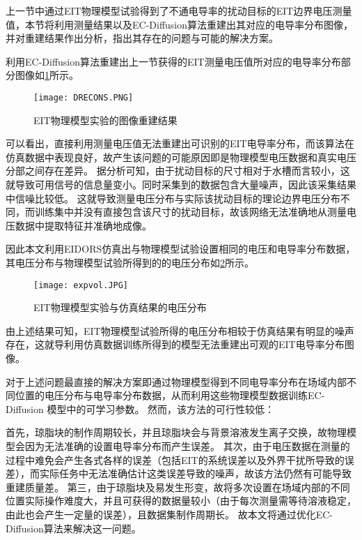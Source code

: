 上一节中通过EIT物理模型试验得到了不通电导率的扰动目标的EIT边界电压测量值，本节将利用测量结果以及EC-Diffusion算法重建出其对应的电导率分布图像，
并对重建结果作出分析，指出其存在的问题与可能的解决方案。

利用EC-Diffusion算法重建出上一节获得的EIT测量电压值所对应的电导率分布部分图像如\cref{figure:DRECONS}所示。
\begin{figure}[h]
    \centering
    \texttt{[image: DRECONS.PNG]}
    \caption{EIT物理模型实验的图像重建结果}
    \label{figure:DRECONS}
\end{figure}

可以看出，直接利用测量电压值无法重建出可识别的EIT电导率分布，而该算法在仿真数据中表现良好，故产生该问题的可能原因即是物理模型电压数据和真实电压分部之间存在差异。
据分析可知，由于扰动目标的尺寸相对于水槽而言较小，这就导致可用信号的信息量变小。同时采集到的数据包含大量噪声，因此该采集结果中信噪比较低。
这就导致测量电压分布与实际该扰动目标的理论边界电压分布不同，而训练集中并没有直接包含该尺寸的扰动目标，故该网络无法准确地从测量电压数据中提取特征并准确地成像。

因此本文利用EIDORS仿真出与物理模型试验设置相同的电压和电导率分布数据，其电压分布与物理模型试验所得到的的电压分布如\cref{figure:expvol}所示。
\begin{figure}[h]
    \centering
    \texttt{[image: expvol.JPG]}
    \caption{EIT物理模型实验与仿真结果的电压分布}
    \label{figure:expvol}
\end{figure}

由上述结果可知，EIT物理模型试验所得的电压分布相较于仿真结果有明显的噪声存在，这就导利用仿真数据训练所得到的模型无法重建出可观的EIT电导率分布图像。

对于上述问题最直接的解决方案即通过物理模型得到不同电导率分布在场域内部不同位置的电压分布与电导率分布数据，从而利用这些物理模型数据训练EC-Diffusion 模型中的可学习参数。
然而，该方法的可行性较低：

首先，琼脂块的制作周期较长，并且琼脂块会与背景溶液发生离子交换，故物理模型会因为无法准确的设置电导率分布而产生误差。
其次，由于电压数据在测量的过程中难免会产生各式各样的误差（包括EIT的系统误差以及外界干扰所导致的误差），而实际任务中无法准确估计这类误差导致的噪声，故该方法仍然有可能导致重建质量差。
第三，由于琼脂块及易发生形变，故将多次设置在场域内部的不同位置实际操作难度大，并且可获得的数据量较小（由于每次测量需等待溶液稳定，由此也会产生一定量的误差），且数据集制作周期长。
故本文将通过优化EC-Diffusion算法来解决这一问题。

